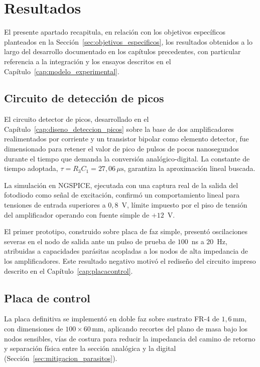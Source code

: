 \chapter*{Resultados}
\label{cap:resultados}
{}

El presente apartado recapitula, en relación con los objetivos específicos
planteados en la Sección~\ref{sec:objetivos_especificos}, los resultados obtenidos a
lo largo del desarrollo documentado en los capítulos precedentes, con particular
referencia a la integración y los ensayos descritos en el
Capítulo~\ref{cap:modelo_experimental}.

\section*{Circuito de detección de picos}

El circuito detector de picos, desarrollado en el
Capítulo~\ref{cap:diseno_deteccion_picos} sobre la base de dos amplificadores
realimentados por corriente y un transistor bipolar como elemento detector, fue
dimensionado para retener el valor de pico de pulsos de pocos nanosegundos durante
el tiempo que demanda la conversión analógico-digital. La constante de tiempo
adoptada, $\tau = R_3 C_1 = 27{,}06\,\mu\text{s}$, garantiza la aproximación lineal
buscada.

La simulación en NGSPICE, ejecutada con una captura real de la salida del fotodiodo
como señal de excitación, confirmó un comportamiento lineal para tensiones de entrada
superiores a $0{,}8$~V, límite impuesto por el piso de tensión del amplificador
operando con fuente simple de $+12$~V.

El primer prototipo, construido sobre placa de faz simple, presentó oscilaciones
severas en el nodo de salida ante un pulso de prueba de $100$~ns a $20$~Hz, atribuidas
a capacidades parásitas acopladas a los nodos de alta impedancia de los amplificadores.
Este resultado negativo motivó el rediseño del circuito impreso descrito en el
Capítulo~\ref{cap:placacontrol}.

\section*{Placa de control}

La placa definitiva se implementó en doble faz sobre sustrato FR-4 de
$1{,}6\,\text{mm}$, con dimensiones de $100 \times 60\,\text{mm}$, aplicando recortes
del plano de masa bajo los nodos sensibles, vías de costura para reducir la impedancia
del camino de retorno y separación física entre la sección analógica y la digital
(Sección~\ref{sec:mitigacion_parasitos}).

